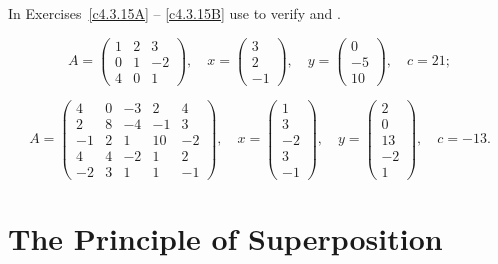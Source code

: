 \noindent In Exercises~\ref{c4.3.15A} -- \ref{c4.3.15B} use \Matlab to
verify  and .
\begin{exercise} \label{c4.3.15A}
\begin{equation*} \label{eq4.3.15a}
A = \left(
\begin{array}{rrr}
 1 & 2 & 3  \\
 0 & 1 & -2  \\
 4 & 0 & 1
\end{array}
\right),\quad
x=\left(
\begin{array}{r}
 3   \\
 2   \\
 -1
\end{array}
\right),\quad
y=\left(
\begin{array}{r}
 0   \\
 -5   \\
 10
\end{array}
\right),\quad c=21;
\end{equation*}
\end{exercise}
\begin{exercise} \label{c4.3.15B}
\begin{equation*} \label{eq4.3.15b}
A = \left(
\begin{array}{rrrrr}
 4 & 0 & -3 & 2 & 4 \\
 2 & 8 & -4 & -1 & 3 \\
 -1 & 2 & 1 & 10 & -2 \\
 4 & 4 & -2 & 1 & 2 \\
 -2 & 3 & 1 & 1 & -1
\end{array}
\right),\quad
x=\left(
\begin{array}{r}
 1   \\
 3   \\
 -2   \\
 3   \\
 -1
\end{array}
\right),\quad
y=\left(
\begin{array}{r}
 2   \\
 0   \\
 13   \\
 -2   \\
 1
\end{array}
\right),\quad c=-13.
\end{equation*}
\end{exercise}




\section{The Principle of Superposition}
\label{S:Superposition}

